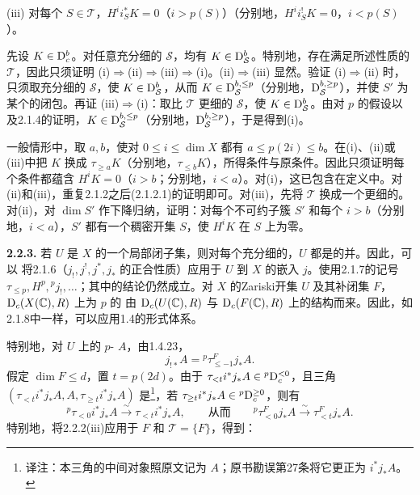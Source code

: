 (iii) 对每个 $S\in\mathcal T$，$H^ii_S^*K=0$（$i>p(S)$）（分别地，$H^ii_S^!K=0$，$i<p(S)$）。

先设 $K\in\mathrm{D}_c^b$。对任意充分细的 $\mathcal S$，均有 $K\in\mathrm{D}_{\mathcal S}^b$。特别地，存在满足所述性质的 $\mathcal T$，因此只须证明 (i)$\Rightarrow$(ii)$\Rightarrow$(iii)$\Rightarrow$(i)。(ii)$\Rightarrow$(iii) 显然。验证 (i)$\Rightarrow$(ii) 时，只须取充分细的 $\mathcal S$，使 $K\in\mathrm{D}_{\mathcal S}^b$，从而 $K\in\mathrm{D}_{\mathcal S}^{b,\leq p}$（分别地，$\mathrm{D}_{\mathcal S}^{b,\geq p}$），并使 $S'$ 为某个的闭包。再证 (iii)$\Rightarrow$(i)：取比 $\mathcal T$ 更细的 $\mathcal S$，使 $K\in\mathrm{D}_{\mathcal S}^b$。由对 $p$ 的假设以及2.1.4的证明，$K\in\mathrm{D}_{\mathcal S}^{b,\leq p}$（分别地，$\mathrm{D}_{\mathcal S}^{b,\geq p}$），于是得到(i)。

一般情形中，取 $a,b$，使对 $0\leq i\leq\dim X$ 都有 $a\leq p(2i)\leq b$。在(i)、(ii)或(iii)中把 $K$ 换成 $\tau_{\geq a}K$（分别地，$\tau_{\leq b}K$），所得条件与原条件。因此只须证明每个条件都蕴含 $H^iK=0$（$i>b$；分别地，$i<a$）。对(i)，这已包含在定义中。对(ii)和(iii)，重复2.1.2之后(2.1.2.1)的证明即可。对(iii)，先将 $\mathcal T$ 换成一个更细的。对(ii)，对 $\dim S'$ 作下降归纳，证明：对每个不可约子簇 $S'$ 和每个 $i>b$（分别地，$i<a$），$S'$ 都有一个稠密开集 $S$，使 $H^iK$ 在 $S$ 上为零。

\par\medskip\noindent\textbf{2.2.3.} 若 $U$ 是 $X$ 的一个局部闭子集，则对每个充分细的，$U$ 都是的并。因此，可以
将2.1.6（$j_!,j^!,j^*,j_*$ 的正合性质）应用于 $U$ 到 $X$ 的嵌入 $j$。使用2.1.7的记号 $\tau_{\leq p},H^p,{}^pj_!,\ldots$；其中的结论仍然成立。对 $X$ 的Zariski开集 $U$ 及其补闭集 $F$，$\mathrm{D}_c(X(\mathbb C),R)$ 上为 $p$ 的 由 $\mathrm{D}_c(U(\mathbb C),R)$ 与 $\mathrm{D}_c(F(\mathbb C),R)$ 上的结构而来。因此，如2.1.8中一样，可以应用1.4的形式体系。

特别地，对 $U$ 上的 $p$- $A$，由1.4.23，
\begin{equation*}
 j_{!*}A={}^p\tau^F_{\leq-1}j_*A.\tag{2.2.3.1}
\end{equation*}
假定 $\dim F\leq d$，置 $t=p(2d)$。由于 $\tau_{<t}i^*j_*A\in{}^p\mathrm{D}_c^{<0}$，且三角 $(\tau_{<t}i^*j_*A,\allowbreak A,\allowbreak\tau_{\geq t}i^*j_*A)$ 是\footnote{译注：本三角的中间对象照原文记为 $A$；原书勘误第27条将它更正为 $i^*j_*A$。}，若 $\tau_{\geq t}i^*j_*A\in{}^p\mathrm{D}_c^{\geq0}$，则有
\[
 {}^p\tau_{<0}i^*j_*A\xrightarrow{\sim}\tau_{<t}i^*j_*A,
 \qquad\text{从而}\qquad
 {}^p\tau^F_{<0}j_*A\xrightarrow{\sim}\tau^F_{<t}j_*A.
\]
特别地，将2.2.2(iii)应用于 $F$ 和 $\mathcal T=\{F\}$，得到：


